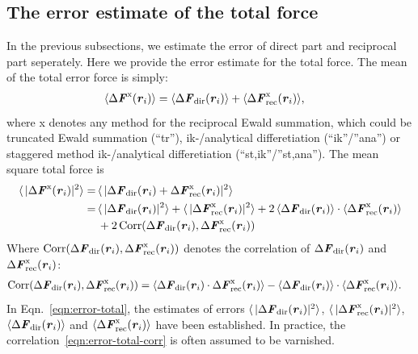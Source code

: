 \documentclass[aps,pre,preprint]{revtex4}
\renewcommand{\v}[1]{\textbf{\textit{#1}}}
\begin{document}
\subsection{The error estimate of the total force}

In the previous subsections, we estimate the error of direct part and
reciprocal part seperately. Here we provide the error estimate for the
total force. The mean of the total error force is simply:
\begin{align}
  \langle\Delta\v F^{\textrm{x}}(\v r_i) \rangle
  &=
  \langle\Delta\v F_{\textrm{dir}}(\v r_i) \rangle +
  \langle\Delta\v F^{\textrm{x}}_{\textrm{rec}}(\v r_i) \rangle,
\end{align}
where \textrm{x}
denotes any method for the reciprocal Ewald summation, which
could be truncated Ewald summation (``tr''), ik-/analytical differetiation
(``ik''/''ana'') or staggered method
ik-/analytical differetiation (``st,ik''/''st,ana'').
The mean square total force is
\begin{align}\nonumber
  \langle\,\vert\Delta\v F^{\textrm{x}}(\v r_i)\vert^2\rangle
  = \,&
  \langle\,\vert
  \Delta\v F_{\textrm{dir}}(\v r_i) + \Delta\v F^{\textrm{x}}_{\textrm{rec}}(\v r_i) 
  \vert^2 \rangle \\\nonumber
  = \,&
  \langle\,\vert\Delta\v F_{\textrm{dir}}(\v r_i)\vert^2\rangle +
  \langle\,\vert\Delta\v F^{\textrm{x}}_{\textrm{rec}}(\v r_i)\vert^2\rangle +
  2\,\langle\Delta\v F_{\textrm{dir}}(\v r_i)\rangle
  \cdot \langle\Delta\v F^{\textrm{x}}_{\textrm{rec}}(\v r_i)\rangle \\
  \label{eqn:error-total}
  &
  + 2\,\textrm{Corr}(\Delta\v F_{\textrm{dir}}(\v r_i),
  \Delta\v F^{\textrm{x}}_{\textrm{rec}}(\v r_i))
\end{align}
Where $ \textrm{Corr}(\Delta\v F_{\textrm{dir}}(\v r_i), \Delta\v
F^{\textrm{x}}_{\textrm{rec}}(\v r_i))$ denotes the correlation of
$\Delta\v F_{\textrm{dir}}(\v r_i)$ and $\Delta\v
F^{\textrm{x}}_{\textrm{rec}}(\v r_i)$:
\begin{align}\label{eqn:error-total-corr}
  \textrm{Corr}(\Delta\v F_{\textrm{dir}}(\v r_i),
  \Delta\v F^{\textrm{x}}_{\textrm{rec}}(\v r_i))
  & =
  \langle
  \Delta\v F_{\textrm{dir}}(\v r_i)\cdot
  \Delta\v F^{\textrm{x}}_{\textrm{rec}}(\v r_i)
  \rangle -
  \langle
  \Delta\v F_{\textrm{dir}}(\v r_i)
  \rangle\cdot
  \langle
  \Delta\v F^{\textrm{x}}_{\textrm{rec}}(\v r_i)
  \rangle.
\end{align}
In Eqn.~\eqref{eqn:error-total}, the estimates of errors
$\langle\,\vert\Delta\v F_{\textrm{dir}}(\v r_i)\vert^2\rangle $,
$\langle\,\vert\Delta\v F^{\textrm{x}}_{\textrm{rec}}(\v
r_i)\vert^2\rangle $, $\langle\Delta\v F_{\textrm{dir}}(\v
r_i)\rangle$ and $\langle\Delta\v F^{\textrm{x}}_{\textrm{rec}}(\v
r_i)\rangle $ have been established.
In practice, the correlation~\eqref{eqn:error-total-corr}
is often assumed to be varnished.
\end{document}
